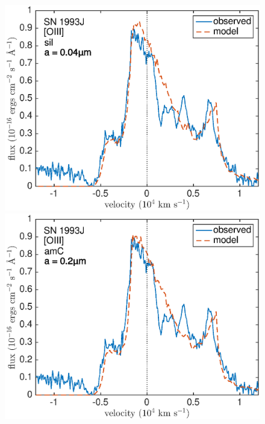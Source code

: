 {\begin{figure}[!t]
\centering
\includegraphics[scale=0.4,clip=true, trim=0 0 40 20]{chapters/chapter6/figs/93J/smooth/OIII} \hspace{0.5mm}
\includegraphics[scale=0.4,clip=true, trim=40 0 40 20]{chapters/chapter6/figs/93J/smooth/OIII_amC}


\end{figure}}
